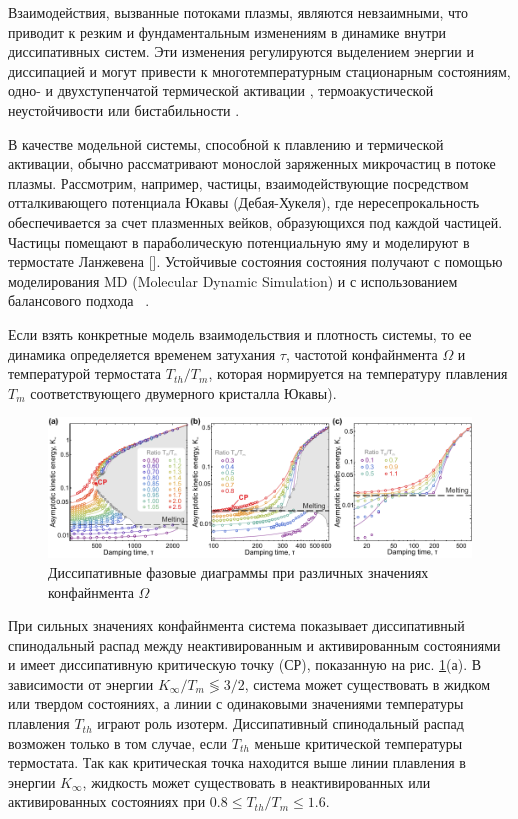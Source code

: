 Взаимодействия, вызванные потоками плазмы, являются невзаимными, что приводит к резким и фундаментальным изменениям в динамике внутри диссипативных систем. Эти изменения регулируются выделением энергии и диссипацией \cite{10.1039/c8sm01836g} и могут привести к многотемпературным стационарным состояниям\cite{10.1103/physrevx.5.011035}, одно- и двухступенчатой термической 
активации \cite{10.1103/physreve.96.043201, 10.1103/physreve.100.023203, 10.3367/ufne.2019.01.038520}, термоакустической неустойчивости \cite{10.1103/physrevlett.121.075003} или бистабильности \cite{10.1103/physrevlett.119.178004}. 

В качестве модельной системы, способной к плавлению и термической активации, обычно рассматривают монослой заряженных микрочастиц в потоке плазмы. Рассмотрим, например, частицы, взаимодействующие посредством отталкивающего потенциала Юкавы (Дебая-Хукеля), где нересепрокальность обеспечивается за счет плазменных вейков, образующихся под каждой частицей. Частицы помещают в параболическую потенциальную яму и моделируют в термостате Ланжевена []. 
Устойчивые состояния состояния получают с помощью моделирования MD (Molecular Dynamic Simulation) и с использованием балансового подхода ~\cite{10.1039/c8sm01836g}. 

Если взять конкретные модель взаимодельствия и плотность системы, то ее динамика определяется временем затухания $\tau$, частотой конфайнмента $\Omega$ и температурой термостата $T_{th}/T_m$, которая нормируется на температуру плавления $T_m$ соответствующего двумерного кристалла Юкавы).

\begin{figure}[htbp]
\centerline{\includegraphics[width=1.0\linewidth]{Ris/DPD-Figure1.pdf}}
\caption{Диссипативные фазовые диаграммы при различных значениях конфайнмента $\Omega$}
\label{DPD-Figure1}
\end{figure}


При сильных значениях конфайнмента система показывает диссипативный спинодальный распад между неактивированным и активированным состояниями и имеет  диссипативную критическую точку (СР), показанную на рис. \ref{DPD-Figure1}(а). В зависимости от 
энергии $K_{\infty} / T_m \lessgtr 3/2$, система может существовать в жидком или твердом состояниях, 
а линии с одинаковыми значениями температуры плавления $T_{th}$ играют роль изотерм. Диссипативный 
спинодальный распад возможен только в том случае, если $T_{th}$ меньше критической температуры термостата. Так как критическая точка находится выше линии плавления в 
энергии $K_{\infty}$, жидкость может существовать в неактивированных или активированных состояниях при $0.8 \leq T_{th}/T_m \leq 1.6$.


